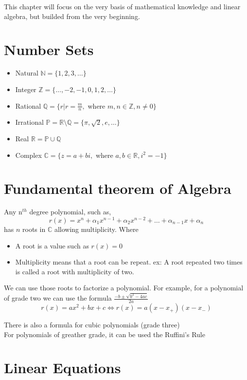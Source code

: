 This chapter will focus on the very basis of mathematical knowledge and linear algebra, but builded from the very beginning.

\section{Number Sets}
\begin{itemize}
    \item Natural $\mathbb{N} = \{1, 2, 3, \dots\}$
    \item Integer $\mathbb{Z} = \{\dots, -2, -1, 0, 1, 2, \dots\}$
    \item Rational $\mathbb{Q} = \{r | r= \frac{m}{n},$ where $m,n \in \mathbb{Z}, n \neq 0\}$
    \item Irrational $\mathbb{P} = \mathbb{R} \setminus \mathbb{Q} = \{\pi, \sqrt{2}, e, \dots \}$
    \item Real $\mathbb{R} = \mathbb{P} \cup \mathbb{Q}$
    \item Complex $\mathbb{C} = \{ z = a +bi, $ where $a,b\in \mathbb{R}, i^2=-1\}$
\end{itemize}

\section{Fundamental theorem of Algebra}
Any n$^{th}$ degree polynomial, such as,
\[ r(x) = x^n + \alpha_1 x^{n-1} + \alpha_2 x^{n-2} + \dots + \alpha_{n-1}x + \alpha_n \]
has $n$ roots in $\mathbb{C}$ allowing multiplicity. Where
\begin{itemize}
    \item A root is a value such as $r(x)=0$
    \item Multiplicity means that a root can be repeat. ex: A root repeated two times is called a root with multiplicity of two.
\end{itemize} 

We can use those roots to factorize a polynomial. For example, for a polynomial of grade two we can use the formula
$\frac{-b \pm \sqrt{b^2 - 4ac}}{2a}$
\[ r(x) = ax^2 + bx + c \Leftrightarrow r(x) = a(x-x_+)(x-x_-) \]

There is also a formula for cubic polynomials (grade three)\\

For polynomials of greather grade, it can be used the Ruffini's Rule\\

\section{Linear Equations}
